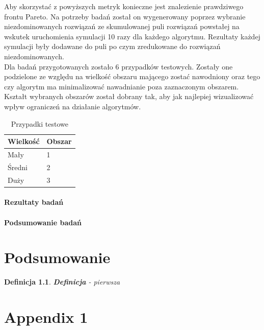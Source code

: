 \documentclass[twoside]{iisthesis}
\newtheorem{mydef}{Definicja}
\begin{document}
Aby skorzystać z powyższych metryk konieczne jest znalezienie prawdziwego frontu Pareto. Na potrzeby badań został on wygenerowany   poprzez wybranie niezdominowanych rozwiązań ze skumulowanej puli rozwiązań powstałej na wskutek uruchomienia symulacji 10 razy dla każdego algorytmu. Rezultaty każdej symulacji były dodawane do puli po czym zredukowane do rozwiązań niezdominowanych.\\
Dla badań przygotowanych zostało 6 przypadków testowych. Zostały one podzielone ze względu na wielkość obszaru mającego zostać nawodniony oraz tego czy algorytm ma minimalizować nawadnianie poza zaznaczonym obszarem. Kształt wybranych obszarów został dobrany tak, aby jak najlepiej wizualizować wpływ ograniczeń na działanie algorytmów.

\begin{table}[]
\centering
\caption{Przypadki testowe}
\label{my-label}
\begin{tabular}{|l|l|}
\hline
Wielkość & Obszar \\ \hline
Mały & 1 \\ \hline
Średni & 2 \\ \hline
Duży & 3 \\ \hline
\end{tabular}
\end{table}

\subsubsection{Rezultaty badań}
\subsubsection{Podsumowanie badań}

\chapter{Podsumowanie}

\begin{mydef}
\textbf{Definicja} - pierwsza
\end{mydef}




 \clearpage
\appendix
\chapter{Appendix 1}


\clearpage
\pagestyle{plain}
\listofmyfigure
\listofmyequations
\listofmyalgorithm
\clearpage




\end{document}
